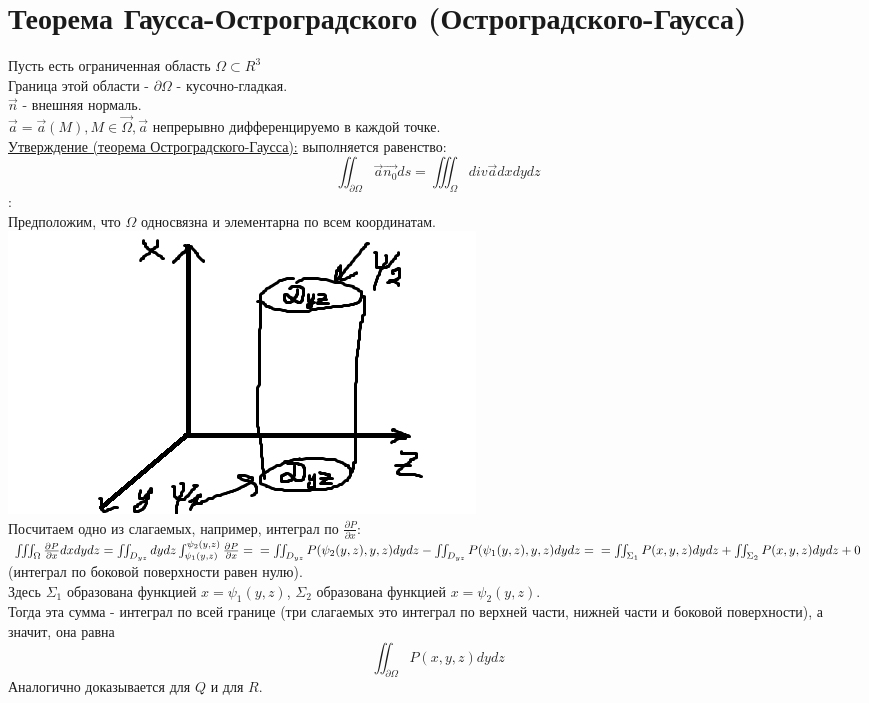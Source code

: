 \documentclass[12pt]{article}
\begin{document}
\section{Теорема Гаусса-Остроградского (Остроградского-Гаусса)}
Пусть есть ограниченная область $\Omega \subset R^3$\\
Граница этой области - $\partial \Omega$ - кусочно-гладкая.\\
$\overrightarrow{n}$ - внешняя нормаль.\\
$\overrightarrow{a} = \overrightarrow{a} (M), M \in \overrightarrow{\Omega}, \overrightarrow{a}$ непрерывно дифференцируемо в каждой точке.\\
\uline{Утверждение (теорема Остроградского-Гаусса):} выполняется равенство:\\
$$\iint_{\partial\Omega} \overrightarrow{a} \overrightarrow{n_0} ds = \iiint_{\Omega} div \overrightarrow{a} dxdydz$$
:\\
Предположим, что $\Omega$ односвязна и элементарна по всем координатам.\\
\includegraphics{ostrogradGaussProof}\\
Посчитаем одно из слагаемых, например, интеграл по $\frac{\partial P}{\partial x}$:\\
$\iiint_\Omega \frac{\partial P}{\partial x} dxdydz = \iint_{D_{yz}} dydz \int_{\psi_1(y,z)}^{\psi_2(y,z)} \frac{\partial P}{\partial x} =\\= \iint_{D_{yz}} P(\psi_2(y,z),y,z)dydz-\iint_{D_{yz}} P(\psi_1(y,z),y,z)dydz =\\= \iint_{\Sigma_1} P(x,y,z) dydz + \iint_{\Sigma_2} P(x,y,z) dydz + 0$ (интеграл по боковой поверхности равен нулю).\\
Здесь $\Sigma_1$ образована функцией $x = \psi_1(y,z)$, $\Sigma_2$ образована функцией $x = \psi_2(y,z)$.\\
Тогда эта сумма - интеграл по всей границе (три слагаемых это интеграл по верхней части, нижней части и боковой поверхности), а значит, она равна\\
$$\iint_{\partial \Omega} P(x,y,z) dydz$$
Аналогично доказывается для $Q$ и для $R$.\\
\end{document}
